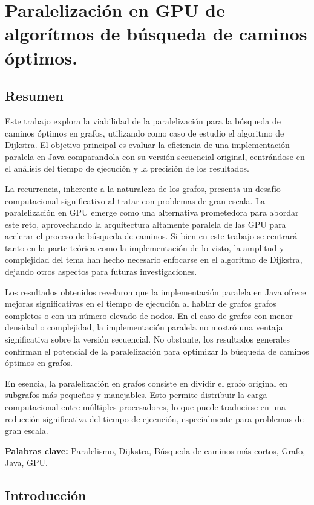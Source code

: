 \chapter{Paralelización en GPU de algorítmos de búsqueda de caminos óptimos.}
\section{Resumen}
Este trabajo explora la viabilidad de la paralelización para la búsqueda de caminos óptimos en grafos, utilizando como caso de estudio el algoritmo de Dijkstra. El objetivo principal es evaluar la eficiencia de una implementación paralela en Java comparandola con su versión secuencial original, centrándose en el análisis del tiempo de ejecución y la precisión de los resultados.

La recurrencia, inherente a la naturaleza de los grafos, presenta un desafío computacional significativo al tratar con problemas de gran escala. La paralelización en GPU emerge como una alternativa prometedora para abordar este reto, aprovechando la arquitectura altamente paralela de las GPU para acelerar el proceso de búsqueda de caminos. Si bien en este trabajo se centrará tanto en la parte teórica como la implementación de lo visto, la amplitud y complejidad del tema han hecho necesario enfocarse en el algoritmo de Dijkstra, dejando otros aspectos para futuras investigaciones.

Los resultados obtenidos revelaron que la implementación paralela en Java ofrece mejoras significativas en el tiempo de ejecución al hablar de grafos grafos completos o con un número elevado de nodos. En el caso de grafos con menor densidad o complejidad, la implementación paralela no mostró una ventaja significativa sobre la versión secuencial. No obstante, los resultados generales confirman el potencial de la paralelización para optimizar la búsqueda de caminos óptimos en grafos.

En esencia, la paralelización en grafos consiste en dividir el grafo original en subgrafos más pequeños y manejables. Esto permite distribuir la carga computacional entre múltiples procesadores, lo que puede traducirse en una reducción significativa del tiempo de ejecución, especialmente para problemas de gran escala.

\textbf{Palabras clave:} Paralelismo, Dijkstra, Búsqueda de caminos más cortos, Grafo, Java, GPU. 

\section{Introducción}

